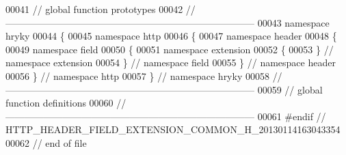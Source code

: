 \begin{DoxyCode}
00041 \textcolor{comment}{// global function prototypes}
00042 \textcolor{comment}{//
      ------------------------------------------------------------------------------}
00043 \textcolor{keyword}{namespace }hryky
00044 \{
00045 \textcolor{keyword}{namespace }http
00046 \{
00047 \textcolor{keyword}{namespace }header
00048 \{
00049 \textcolor{keyword}{namespace }field
00050 \{
00051 \textcolor{keyword}{namespace }extension
00052 \{
00053 \} \textcolor{comment}{// namespace extension}
00054 \} \textcolor{comment}{// namespace field}
00055 \} \textcolor{comment}{// namespace header}
00056 \} \textcolor{comment}{// namespace http}
00057 \} \textcolor{comment}{// namespace hryky}
00058 \textcolor{comment}{//
      ------------------------------------------------------------------------------}
00059 \textcolor{comment}{// global function definitions}
00060 \textcolor{comment}{//
      ------------------------------------------------------------------------------}
00061 \textcolor{preprocessor}{#endif // HTTP\_HEADER\_FIELD\_EXTENSION\_COMMON\_H\_20130114163043354}
00062 \textcolor{preprocessor}{}\textcolor{comment}{// end of file}
\end{DoxyCode}
